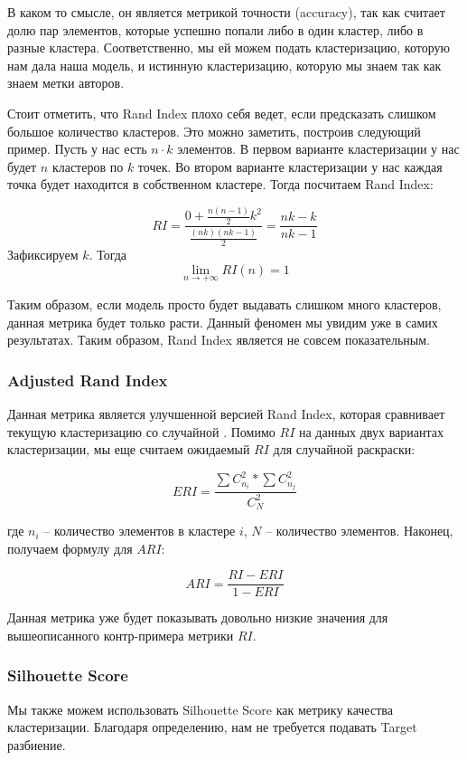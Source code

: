 В каком то смысле, он является метрикой точности (accuracy), так как считает долю пар элементов, которые успешно попали либо в один кластер, либо в разные кластера. Соответственно, мы ей можем подать кластеризацию, которую нам дала наша модель, и истинную кластеризацию, которую мы знаем так как знаем метки авторов.

Стоит отметить, что Rand Index плохо себя ведет, если предсказать слишком большое количество кластеров. Это можно заметить, построив следующий пример. Пусть у нас есть $n \cdot k$ элементов. В первом варианте кластеризации у нас будет $n$ кластеров по $k$ точек. Во втором варианте кластеризации у нас каждая точка будет находится в собственном кластере. Тогда посчитаем Rand Index:

$$
RI = \frac{0 + \frac{n(n-1)}{2}k^2}{\frac{(nk)(nk - 1)}{2}} = \frac{nk - k}{nk - 1}
$$
\noindent
Зафиксируем $k$. Тогда $$\lim_{n \rightarrow +\infty} RI(n) = 1$$

Таким образом, если модель просто будет выдавать слишком много кластеров, данная метрика будет только расти. Данный феномен мы увидим уже в самих результатах. Таким образом, Rand Index является не совсем показательным.

\subsubsection{Adjusted Rand Index}

Данная метрика является улучшенной версией Rand Index, которая сравнивает текущую кластеризацию со случайной \cite{adjusted-rand}. Помимо $RI$ на данных двух вариантах кластеризации, мы еще считаем ожидаемый $RI$ для случайной раскраски:

$$
ERI = \frac{\sum C_{n_i}^2 * \sum C_{n_j}^2}{C_N^2}
$$

\noindent где $n_i$ -- количество элементов в кластере $i$, $N$ -- количество элементов. Наконец, получаем формулу для $ARI$:

$$
ARI = \frac{RI - ERI}{1 - ERI}
$$

Данная метрика уже будет показывать довольно низкие значения для вышеописанного контр-примера метрики $RI$. 

\subsubsection{Silhouette Score}

Мы также можем использовать Silhouette Score как метрику качества кластеризации. Благодаря определению, нам не требуется подавать Target разбиение.

